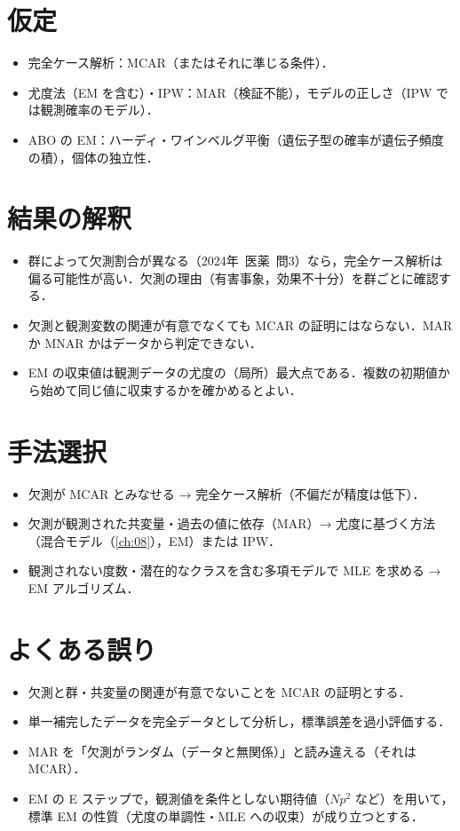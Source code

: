\documentclass[a4paper,11pt,openany]{ltjsbook}
\newcommand{\kakomon}[2]{\mbox{#1年 医薬 問#2}}
\begin{document}
\section{仮定}\label{sec:16-assump}
\begin{itemize}
\item 完全ケース解析：MCAR（またはそれに準じる条件）．
\item 尤度法（EM を含む）・IPW：MAR（検証不能），モデルの正しさ（IPW では観測確率のモデル）．
\item ABO の EM：ハーディ・ワインベルグ平衡（遺伝子型の確率が遺伝子頻度の積），個体の独立性．
\end{itemize}

\section{結果の解釈}\label{sec:16-interp}
\begin{itemize}
\item 群によって欠測割合が異なる（\kakomon{2024}{3}）なら，完全ケース解析は偏る可能性が高い．欠測の理由（有害事象，効果不十分）を群ごとに確認する．
\item 欠測と観測変数の関連が有意でなくても MCAR の証明にはならない．MAR か MNAR かはデータから判定できない．
\item EM の収束値は観測データの尤度の（局所）最大点である．複数の初期値から始めて同じ値に収束するかを確かめるとよい．
\end{itemize}

\section{手法選択}\label{sec:16-choice}
\begin{itemize}
\item 欠測が MCAR とみなせる → 完全ケース解析（不偏だが精度は低下）．
\item 欠測が観測された共変量・過去の値に依存（MAR）→ 尤度に基づく方法（混合モデル（\cref{ch:08}），EM）または IPW．
\item 観測されない度数・潜在的なクラスを含む多項モデルで MLE を求める → EM アルゴリズム．
\end{itemize}

\section{よくある誤り}\label{sec:16-err}
\begin{warnbox}
\begin{itemize}
\item 欠測と群・共変量の関連が有意でないことを MCAR の証明とする．
\item 単一補完したデータを完全データとして分析し，標準誤差を過小評価する．
\item MAR を「欠測がランダム（データと無関係）」と読み違える（それは MCAR）．
\item EM の E ステップで，観測値を条件としない期待値（$Np^2$ など）を用いて，標準 EM の性質（尤度の単調性・MLE への収束）が成り立つとする．
\end{itemize}
\end{warnbox}
\end{document}
